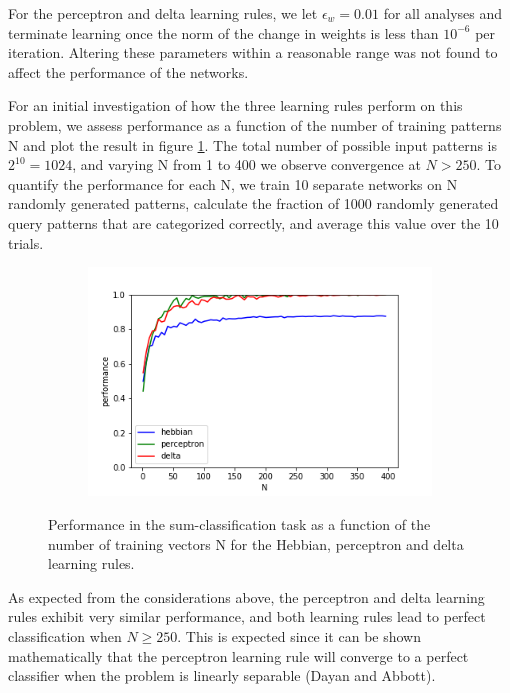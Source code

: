 \documentclass{article}
\begin{document}
For the perceptron and delta learning rules, we let $\epsilon_w = 0.01$ for all analyses and terminate learning once the norm of the change in weights is less than $10^{-6}$ per iteration. Altering these parameters within a reasonable range was not found to affect the performance of the networks.

For an initial investigation of how the three learning rules perform on this problem, we assess performance as a function of the number of training patterns N and plot the result in figure \ref{fig:performance_sum}. The total number of possible input patterns is $2^{10} = 1024$, and varying N from 1 to 400 we observe convergence at $N > 250$. To quantify the performance for each N, we train 10 separate networks on N randomly generated patterns, calculate the fraction of 1000 randomly generated query patterns that are categorized correctly, and average this value over the 10 trials.

\begin{figure}[h]
	\centering
	\begin{subfigure}[t]{0.60\linewidth}
		\centering
		\includegraphics[width = 1.0\linewidth, trim={10 5 40 30}, clip=true]{figures/compare_sum.png}
	\end{subfigure}%
\caption{Performance in the sum-classification task as a function of the number of training vectors N for the Hebbian, perceptron and delta learning rules.}
\label{fig:performance_sum}
\end{figure}

As expected from the considerations above, the perceptron and delta learning rules exhibit very similar performance, and both learning rules lead to perfect classification when $N \geq 250$. This is expected since it can be shown mathematically that the perceptron learning rule will converge to a perfect classifier when the problem is linearly separable (Dayan and Abbott).
\end{document}
